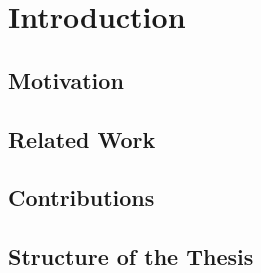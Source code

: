 \chapter{Introduction}



\section{Motivation}



\section{Related Work}



\section{Contributions}



\section{Structure of the Thesis}
